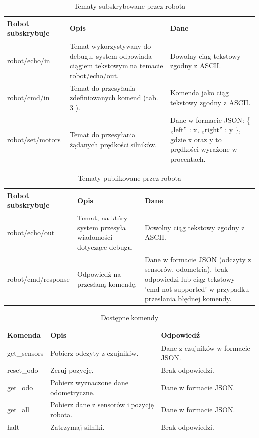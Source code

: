 \documentclass[12pt,twoside]{article}
\begin{document}
\begin{table}[ht]
\caption{Tematy subskrybowane przez robota}
\centering		
	\begin{tabular}{|p{}|p{}|p{}|}	
		\hline
		Robot subskrybuje & Opis & Dane \\
		\hline
		robot/echo/in & Temat wykorzystywany do debugu, system odpowiada ciągiem tekstowym na temacie robot/echo/out. & Dowolny ciąg tekstowy zgodny z ASCII. \\
		\hline
		robot/cmd/in & Temat do przesyłania zdefiniowanych komend (tab. \ref{Tab:RobotCMD} ). & Komenda jako ciąg tekstowy zgodny z ASCII. \\
		\hline
		robot/set/motors & Temat do przesyłania żądanych prędkości silników. & Dane w formacie JSON: \{ „left” : x, „right” : y \}, gdzie x oraz y to prędkości wyrażone w procentach. \\
		\hline
	\end{tabular}	
	
\label{Tab:RobotSub}
\end{table}	

\begin{table}[ht]
\caption{Tematy publikowane przez robota}
\centering		
	\begin{tabular}{|p{}|p{}|p{}|}	
		\hline
		Robot subskrybuje & Opis & Dane \\
		\hline
		robot/echo/out & Temat, na który system przesyła wiadomości dotyczące debugu. & Dowolny ciąg tekstowy zgodny z ASCII. \\
		\hline
		robot/cmd/response & Odpowiedź na przesłaną komendę. & Dane w formacie JSON (odczyty z sensorów, odometria), brak odpowiedzi lub ciąg tekstowy 'cmd not supported' w przypadku przesłania błędnej komendy. \\
		\hline
	\end{tabular}	
	
\label{Tab:RobotPub}
\end{table}	

\begin{table}[ht]
\caption{Dostępne komendy}
\centering		
	\begin{tabular}{|p{}|p{}|p{}|}	
		\hline
		Komenda & Opis & Odpowiedź \\
		\hline
		get\_sensors & Pobierz odczyty z czujników. & Dane z czujników w formacie JSON. \\
		\hline
		reset\_odo & Zeruj pozycję. & Brak odpowiedzi. \\
		\hline
		get\_odo & Pobierz wyznaczone dane odometryczne. & Dane w formacie JSON. \\
		\hline
		get\_all & Pobierz dane z sensorów i pozycję robota. & Dane w formacie JSON. \\
		\hline
		halt & Zatrzymaj silniki. & Brak odpowiedzi. \\
		\hline
	\end{tabular}	
	
\label{Tab:RobotCMD}
\end{table}	
\end{document}
